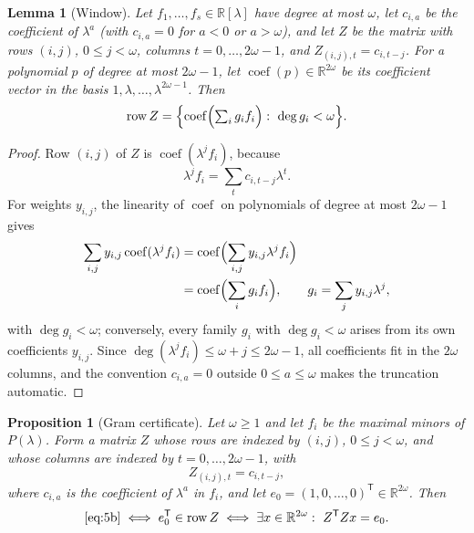 \documentclass[journal]{IEEEtran}
\theoremstyle{plainn}
\newtheorem{lem}[thm]{Lemma}
\newtheorem{prop}[thm]{Proposition}
\theoremstyle{remark}
\begin{document}
\begin{lem}[Window]\label{lem:window}
	Let $f_1,\dots,f_s\in\mathbb R[\lambda]$ have degree at most $\omega$,
	let $c_{i,a}$ be the coefficient of $\lambda^a$ (with $c_{i,a}=0$ for
	$a<0$ or $a>\omega$), and let $Z$ be the matrix with rows $(i,j)$,
	$0\le j<\omega$, columns $t=0,\dots,2\omega-1$, and
	$Z_{(i,j),t}=c_{i,t-j}$. For a polynomial $p$ of degree at most
	$2\omega-1$, let $\operatorname{coef}(p)\in\mathbb R^{2\omega}$ be its
	coefficient vector in the basis $1,\lambda,\dots,\lambda^{2\omega-1}$.
	Then
	\[
	\operatorname{row}Z=
	\Bigl\{
	\operatorname{coef}\Bigl(\textstyle\sum_i g_if_i\Bigr)
	:\ \deg g_i<\omega
	\Bigr\}.
	\]
\end{lem}

\begin{proof}
	Row $(i,j)$ of $Z$ is $\operatorname{coef}(\lambda^jf_i)$, because
	\[
	\lambda^jf_i=\sum_t c_{i,t-j}\lambda^t .
	\]
	For weights $y_{i,j}$, the linearity of $\operatorname{coef}$ on
	polynomials of degree at most $2\omega-1$ gives
	\[
	\begin{aligned}
	\sum_{i,j}y_{i,j}\operatorname{coef}(\lambda^jf_i)
	&=\operatorname{coef}\Bigl(\sum_{i,j}y_{i,j}\lambda^jf_i\Bigr)\\
	&=\operatorname{coef}\Bigl(\sum_i g_if_i\Bigr),
	\qquad g_i=\sum_j y_{i,j}\lambda^j,
	\end{aligned}
	\]
	with $\deg g_i<\omega$; conversely, every family $g_i$ with
	$\deg g_i<\omega$ arises from its own coefficients $y_{i,j}$. Since
	$\deg(\lambda^jf_i)\le\omega+j\le2\omega-1$, all coefficients fit in
	the $2\omega$ columns, and the convention $c_{i,a}=0$ outside
	$0\le a\le\omega$ makes the truncation automatic.
\end{proof}

\begin{prop}[Gram certificate]\label{prop:gram}\label{sec:gram}
	Let $\omega\ge1$ and let $f_i$ be the maximal minors of $P(\lambda)$.
	Form a matrix $Z$ whose rows are indexed by $(i,j)$, $0\le j<\omega$,
	and whose columns are indexed by $t=0,\ldots,2\omega-1$, with
	\[
	Z_{(i,j),t}=c_{i,t-j},
	\]
	where $c_{i,a}$ is the coefficient of $\lambda^a$ in $f_i$, and let
	$e_0=(1,0,\ldots,0)^{\mathsf T}\in\mathbb R^{2\omega}$. Then
	\[
	\eqref{eq:5b}
	\iff e_0^{\mathsf T}\in\operatorname{row}Z
	\iff\exists x\in\mathbb R^{2\omega}:\ Z^{\mathsf T}Zx=e_0 .
	\]
\end{prop}
\end{document}
